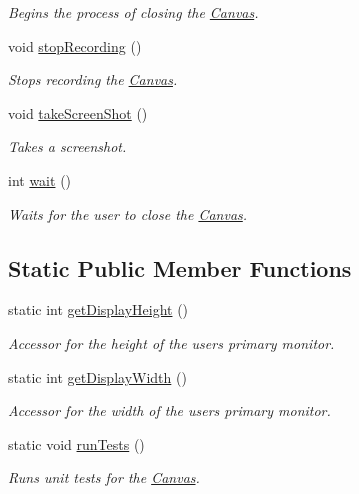 \begin{DoxyCompactItemize}
\begin{DoxyCompactList}\small\item\em Begins the process of closing the \hyperlink{classtsgl_1_1_canvas}{Canvas}. \end{DoxyCompactList}\item 
void \hyperlink{classtsgl_1_1_canvas_ac6035d87aa3bf077031bc0bb6f419b17}{stop\+Recording} ()
\begin{DoxyCompactList}\small\item\em Stops recording the \hyperlink{classtsgl_1_1_canvas}{Canvas}. \end{DoxyCompactList}\item 
void \hyperlink{classtsgl_1_1_canvas_ac035f43763b198f6915a0772973a5ea9}{take\+Screen\+Shot} ()
\begin{DoxyCompactList}\small\item\em Takes a screenshot. \end{DoxyCompactList}\item 
int \hyperlink{classtsgl_1_1_canvas_a39e69fd4d1ad8cf0e22ecea12f1ddf08}{wait} ()
\begin{DoxyCompactList}\small\item\em Waits for the user to close the \hyperlink{classtsgl_1_1_canvas}{Canvas}. \end{DoxyCompactList}\end{DoxyCompactItemize}
\subsection*{Static Public Member Functions}
\begin{DoxyCompactItemize}
\item 
static int \hyperlink{classtsgl_1_1_canvas_a664b101f972845eaf5fdc4d9e664e623}{get\+Display\+Height} ()
\begin{DoxyCompactList}\small\item\em Accessor for the height of the user\textquotesingle{}s primary monitor. \end{DoxyCompactList}\item 
static int \hyperlink{classtsgl_1_1_canvas_abbe5c392cac2320fecf1f2751afb207c}{get\+Display\+Width} ()
\begin{DoxyCompactList}\small\item\em Accessor for the width of the user\textquotesingle{}s primary monitor. \end{DoxyCompactList}\item 
\hypertarget{classtsgl_1_1_canvas_a3365d92635f650cca2eda69812bef60b}{}static void \hyperlink{classtsgl_1_1_canvas_a3365d92635f650cca2eda69812bef60b}{run\+Tests} ()\label{classtsgl_1_1_canvas_a3365d92635f650cca2eda69812bef60b}

\begin{DoxyCompactList}\small\item\em Runs unit tests for the \hyperlink{classtsgl_1_1_canvas}{Canvas}. \end{DoxyCompactList}\end{DoxyCompactItemize}
